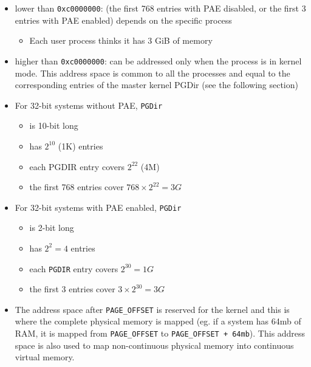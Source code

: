 \begin{itemize}
\item lower than \texttt{0xc0000000}: (the first 768 entries with PAE disabled, or the first 3
  entries with PAE enabled) depends on the specific process
  \begin{itemize}
  \item Each user process thinks it has 3 GiB of memory
  \end{itemize}
\item higher than \texttt{0xc0000000}: can be addressed only when the process is in kernel
  mode. This address space is common to all the processes and equal to the corresponding
  entries of the master kernel PGDir (see the following section)
\item For 32-bit systems without PAE, \texttt{PGDir}
  \begin{itemize}
  \item is 10-bit long 
  \item has $2^{10}$ (1K) entries
  \item each PGDIR entry covers $2^{22}$ (4M)
  \item the first 768 entries cover $768\times{}2^{22}=3G$
  \end{itemize}
\item For 32-bit systems with PAE enabled, \texttt{PGDir}
  \begin{itemize}
  \item is 2-bit long
  \item has $2^2=4$ entries
  \item each \texttt{PGDIR} entry covers $2^{30} = 1G$
  \item the first 3 entries cover $3\times{}2^{30}=3G$
  \end{itemize}
\item The address space after \texttt{PAGE\_OFFSET} is reserved for the kernel and this is
  where the complete physical memory is mapped (eg. if a system has 64mb of RAM, it is
  mapped from \texttt{PAGE\_OFFSET} to \texttt{PAGE\_OFFSET + 64mb}). This address space is
  also used to map non-continuous physical memory into continuous virtual
  memory. 
\end{itemize}

